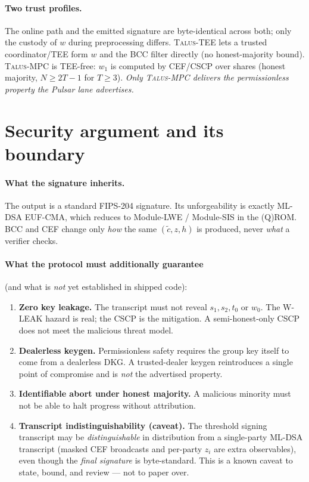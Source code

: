 \documentclass[11pt]{article}
\theoremstyle{definition}
\theoremstyle{plain}
\begin{document}
\paragraph{Two trust profiles.} The online path and the emitted signature are
byte-identical across both; only the custody of \(w\) during preprocessing
differs. \textsc{Talus-TEE} lets a trusted coordinator/TEE form \(w\) and the
BCC filter directly (no honest-majority bound). \textsc{Talus-MPC} is TEE-free:
\(w_1\) is computed by CEF/CSCP over shares (honest majority, \(N\ge 2T-1\) for
\(T\ge 3\)). \emph{Only \textsc{Talus-MPC} delivers the permissionless property
the Pulsar lane advertises.}

\section{Security argument and its boundary}

\paragraph{What the signature inherits.} The output is a standard FIPS-204
signature. Its unforgeability is exactly ML-DSA EUF-CMA, which reduces to
Module-LWE / Module-SIS in the (Q)ROM. BCC and CEF change only \emph{how} the
same \((\tilde c, z, h)\) is produced, never \emph{what} a verifier checks.

\paragraph{What the protocol must additionally guarantee} (and what is
\emph{not} yet established in shipped code):
\begin{enumerate}[leftmargin=1.6em]
  \item \textbf{Zero key leakage.} The transcript must not reveal \(s_1, s_2,
  t_0\) or \(w_0\). The \textsc{W-LEAK} hazard is real; the CSCP is the
  mitigation. A semi-honest-only CSCP does not meet the malicious threat model.
  \item \textbf{Dealerless keygen.} Permissionless safety requires the group key
  itself to come from a dealerless DKG. A trusted-dealer keygen reintroduces a
  single point of compromise and is \emph{not} the advertised property.
  \item \textbf{Identifiable abort under honest majority.} A malicious minority
  must not be able to halt progress without attribution.
  \item \textbf{Transcript indistinguishability (caveat).} The threshold signing
  transcript may be \emph{distinguishable} in distribution from a single-party
  ML-DSA transcript (masked CEF broadcasts and per-party \(z_i\) are extra
  observables), even though the \emph{final signature} is byte-standard. This is
  a known caveat to state, bound, and review --- not to paper over.
\end{enumerate}
\end{document}
